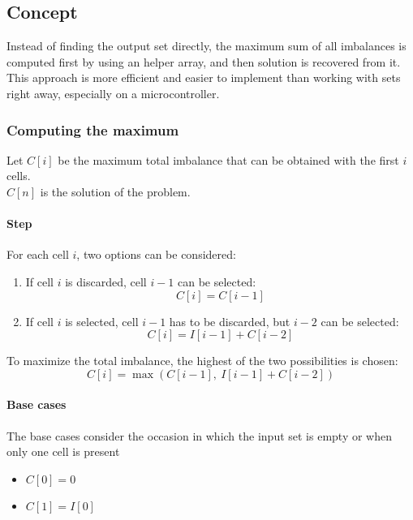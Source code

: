 \subsection{Concept}

Instead of finding the output set directly, the maximum sum of all imbalances is computed first by using an helper array, and then solution is recovered from it. This approach is more efficient and easier to implement than working with sets right away, especially on a microcontroller.

\subsubsection{Computing the maximum}
Let $C[i]$ be the maximum total imbalance that can be obtained with the first $i$ cells.\\
$C[n]$ is the solution of the problem.

\paragraph{Step}

For each cell $i$, two options can be considered:
\begin{enumerate}
    \item If cell $i$ is discarded, cell $i-1$ can be selected:
          \[
              C[i]=C[i-1]
          \]

    \item If cell $i$ is selected, cell $i-1$ has to be discarded, but $i-2$ can be selected:
          \[
              C[i]=I[i-1]+C[i-2]
          \]
\end{enumerate}

To maximize the total imbalance, the highest of the two possibilities is chosen:
\[
    C[i]=\max(C[i-1],\ I[i-1] + C[i-2])
\]



\paragraph{Base cases}
The base cases consider the occasion in which the input set is empty or when only one cell is present
\begin{itemize}
    \item $C[0]=0$
    \item $C[1]=I[0]$
\end{itemize}

